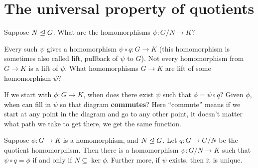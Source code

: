 \section{The universal property of quotients}
Suppose $N\trianglelefteq G$. What are the homomorphisms $\psi:G/N\to K$?

\begin{center}
\end{center}

Every such $\psi$ gives a homomorphism $\psi\circ q: G\to K$ (this homomorphism is sometimes also called lift, pullback of $\psi$ to $G$). Not every homomorphism from $G\to K$ is a lift of $\psi$. What homomorphisms $G\to K$ are lift of some homomorphism $\psi$? \begin{center}
\end{center}
If we start with $\phi: G\to K$, when does there exist $\psi$ such that $\phi=\psi \circ q$? Given $\phi$, when can fill in $\psi$ so that diagram \textbf{commutes}? Here ``commute'' means if we start at any point in the diagram and go to any other point, it doesn't matter what path we take to get there, we get the same function.

\begin{thm}
Suppose $\phi:G\to K$ is a homomorphism, and $N\trianglelefteq G$. Let $q:G\to G/N$ be the quotient homomorphism. Then there is a homomorphism $\psi:G/N\to K$ such that $\psi\circ q=\phi$ if and only if $N\subseteq \ker \phi$. Further more, if $\psi$ exists, then it is unique.
\end{thm}

